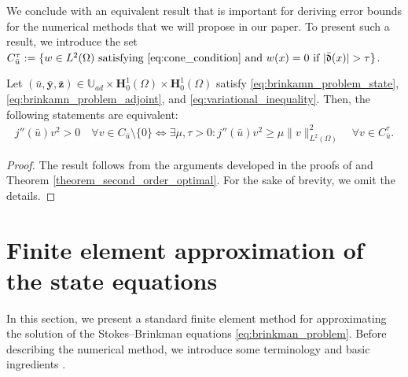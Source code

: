 \documentclass[final]{siamart0216}
\begin{document}
We conclude with an equivalent result that is important for deriving error bounds for the numerical methods that we will propose in our paper. To present such a result, we introduce the set $C_{\bar{u}}^{\tau}:=\{w\in L^2(\Omega) \text{ satisfying } \eqref{eq:cone_condition} \text{ and } w(x)=0 \text{ if } |\bar{\mathfrak{d}}(x)|>\tau\}$.

\begin{theorem}
Let $(\bar{u}, \bar{\mathbf{y}},\bar{\mathbf{z}}) \in \mathbb{U}_{ad} \times \mathbf{H}_0^1(\Omega) \times \mathbf{H}_0^1(\Omega)$ satisfy \eqref{eq:brinkamn_problem_state}, \eqref{eq:brinkamn_problem_adjoint}, and \eqref{eq:variational_inequality}. Then, the following statements are equivalent:
\begin{align}\label{equivalence_condition}
j''(\bar{u})v^2 >0\quad \forall v \in  C_{\bar{u}}\setminus\{0\} \iff \exists \mu,\tau>0: j''(\bar{u})v^2  \geq \mu\|v\|_{L^2{(\Omega)}}^2 \quad \forall v\in C_{\bar{u}}^{\tau}.
\end{align}
\end{theorem}
\begin{proof}
	The result follows from the arguments developed in the proofs of \cite[Theorem 25]{MR3586845} and Theorem \ref{theorem_second_order_optimal}. For the sake of brevity, we omit the details.
\end{proof}

\section{Finite element approximation of the state equations}\label{fem}
In this section, we present a standard finite element method for approximating the solution of the Stokes--Brinkman equations \eqref{eq:brinkman_problem}. Before describing the numerical method, we introduce some terminology and basic ingredients \cite{MR2373954,CiarletBook,Guermond-Ern}.
\end{document}
